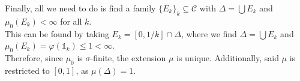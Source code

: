 \documentclass[10pt]{extarticle}
\begin{document}
\begin{description}
\begin{enumerate}[(i)]
          Finally, all we need to do is find a family $\{E_k\}_{k}\subseteq \mathcal{C}$ with $\Delta = \bigcup E_k$ and $\mu_0(E_k) < \infty$ for all $k$.\\

          This can be found by taking $E_k = [0,1/k]\cap \Delta$, where we find $\Delta = \bigcup E_k$ and $\mu_0(E_k) = \varphi(\mathbb{1}_{k}) \leq 1 < \infty$.\\

          Therefore, since $\mu_0$ is $\sigma$-finite, the extension $\mu$ is unique. Additionally, said $\mu$ is restricted to $[0,1]$, as $\mu(\Delta) = 1$.
      \end{enumerate}
  \end{description}
\end{document}
